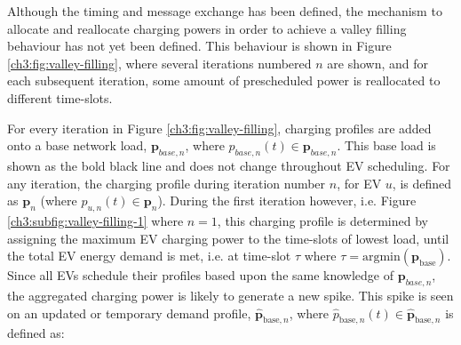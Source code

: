 Although the timing and message exchange has been defined, the mechanism to allocate and reallocate charging powers in order to achieve a valley filling behaviour has not yet been defined.
This behaviour is shown in Figure \ref{ch3:fig:valley-filling}, where several iterations numbered $n$ are shown, and for each subsequent iteration, some amount of prescheduled power is reallocated to different time-slots.




For every iteration in Figure \ref{ch3:fig:valley-filling}, charging profiles are added onto a base network load, $\textbf{p}_{base,n}$, where $p_{base,n}(t) \in \textbf{p}_{base,n}$.
This base load is shown as the bold black line and does not change throughout EV scheduling.
For any iteration, the charging profile during iteration number $n$, for EV $u$, is defined as $\textbf{p}_n$ (where $p_{u,n}(t) \in \textbf{p}_n$).
During the first iteration however, i.e. Figure \ref{ch3:subfig:valley-filling-1} where $n=1$, this charging profile is determined by assigning the maximum EV charging power to the time-slots of lowest load, until the total EV energy demand is met, i.e. at time-slot $\tau$ where $\tau = \text{argmin}(\textbf{p}_\text{base})$.
Since all EVs schedule their profiles based upon the same knowledge of $\textbf{p}_{base,n}$, the aggregated charging power is likely to generate a new spike.
This spike is seen on an updated or temporary demand profile, $\hat{\textbf{p}}_{\text{base}, n}$, where $\hat{p}_{\text{base}, n}(t) \in \hat{\textbf{p}}_{\text{base}, n}$ is defined as:




